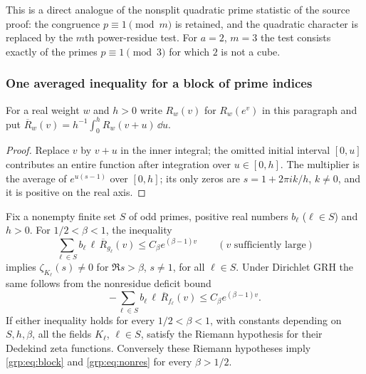 This is a direct analogue of the nonsplit quadratic prime statistic of the
source proof: the congruence $p\equiv1\pmod m$ is retained, and the quadratic
character is replaced by the $m$th power-residue test. For $a=2$, $m=3$ the
test consists exactly of the primes $p\equiv1\pmod3$ for which $2$ is not a
cube.

\subsubsection{One averaged inequality for a block of prime indices}
For a real weight $w$ and $h>0$ write $R_w(v)$ for $R_w(e^v)$ in this
paragraph and put $\overline R_w(v)=h^{-1}\int_0^hR_w(v+u)\,\dd u$.


\begin{proof}
Replace $v$ by $v+u$ in the inner integral; the omitted initial interval
$[0,u]$ contributes an entire function after integration over $u\in[0,h]$.
The multiplier is the average of $e^{u(s-1)}$ over $[0,h]$; its only zeros are
$s=1+2\pi ik/h$, $k\ne0$, and it is positive on the real axis.
\end{proof}

\begin{theorem}\label{grp:thm:block}
Fix a nonempty finite set $S$ of odd primes, positive real numbers $b_\ell$
($\ell\in S$) and $h>0$. For $1/2<\beta<1$, the inequality
\begin{equation}\label{grp:eq:block}
 \sum_{\ell\in S}b_\ell\,\ell\,\overline R_{g_\ell}(v)\le C_\beta e^{(\beta-1)v}
 \qquad(v\text{ sufficiently large})
\end{equation}
implies $\zeta_{K_\ell}(s)\ne0$ for $\Re s>\beta$, $s\ne1$, for all
$\ell\in S$. Under Dirichlet GRH the same follows from the nonresidue deficit
bound
\begin{equation}\label{grp:eq:nonres}
 -\sum_{\ell\in S}b_\ell\,\ell\,\overline R_{f_\ell}(v)\le C_\beta e^{(\beta-1)v}.
\end{equation}
If either inequality holds for every $1/2<\beta<1$, with constants depending
on $S,h,\beta$, all the fields $K_\ell$, $\ell\in S$, satisfy the Riemann
hypothesis for their Dedekind zeta functions. Conversely these Riemann
hypotheses imply \eqref{grp:eq:block} and \eqref{grp:eq:nonres} for every
$\beta>1/2$.
\end{theorem}

